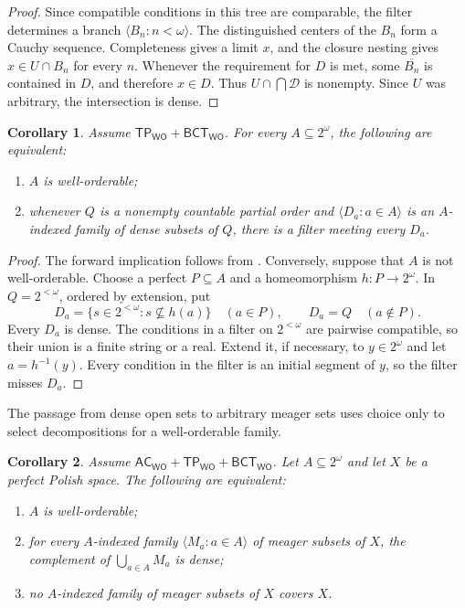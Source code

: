 \documentclass[11pt,reqno]{amsart}
\newcommand{\WO}{\mathsf{WO}}
\newcommand{\BCTWO}{\mathsf{BCT}_{\WO}}
\newcommand{\TP}{\mathsf{TP}_{\WO}}
\theoremstyle{plain}
\newtheorem{corollary}[corollary]{Corollary}
\theoremstyle{definition}
\theoremstyle{remark}
\begin{document}
\begin{proof}
Since compatible conditions in this tree are comparable, the filter determines
a branch $\langle B_n:n<\omega\rangle$.  The distinguished centers of the
$B_n$ form a Cauchy sequence.  Completeness gives a limit $x$, and the closure
nesting gives $x\in U\cap B_n$ for every $n$.  Whenever the requirement for
$D$ is met, some $\overline{B_n}$ is contained in $D$, and therefore
$x\in D$.  Thus $U\cap\bigcap\mathcal D$ is nonempty.  Since $U$ was
arbitrary, the intersection is dense.
\end{proof}

\begin{corollary}\label{cor:indexed-rs}
Assume $\TP+\BCTWO$.  For every $A\subseteq2^\omega$, the following are equivalent:
\begin{enumerate}
\item $A$ is well-orderable;
\item whenever $Q$ is a nonempty countable partial order and
$\langle D_a:a\in A\rangle$ is an $A$-indexed family of dense subsets of
$Q$, there is a filter meeting every $D_a$.
\end{enumerate}
\end{corollary}

\begin{proof}
The forward implication follows from .  Conversely, suppose
that $A$ is not well-orderable.  Choose a perfect $P\subseteq A$ and a
homeomorphism $h:P\to2^\omega$.  In $Q=2^{<\omega}$, ordered by extension,
put
\[
 D_a=\{s\in2^{<\omega}:s\not\subseteq h(a)\}\quad(a\in P),
 \qquad D_a=Q\quad(a\notin P).
\]
Every $D_a$ is dense.  The conditions in a filter on $2^{<\omega}$ are
pairwise compatible, so their union is a finite string or a real.  Extend it,
if necessary, to $y\in2^\omega$ and let $a=h^{-1}(y)$.  Every condition in
the filter is an initial segment of $y$, so the filter misses $D_a$.
\end{proof}

The passage from dense open sets to arbitrary meager sets uses choice only to
select decompositions for a well-orderable family.

\begin{corollary}\label{cor:indexed-meager}
Assume $\mathsf{AC}_{\WO}+\TP+\BCTWO$.  Let $A\subseteq2^\omega$ and let
$X$ be a perfect Polish space.  The following are equivalent:
\begin{enumerate}
\item $A$ is well-orderable;
\item for every $A$-indexed family $\langle M_a:a\in A\rangle$ of meager
subsets of $X$, the complement of $\bigcup_{a\in A}M_a$ is dense;
\item no $A$-indexed family of meager subsets of $X$ covers $X$.
\end{enumerate}
\end{corollary}
\end{document}
